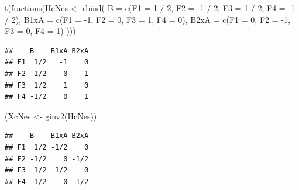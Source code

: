 \documentclass[
  12pt,
]{krantz}
\newenvironment{Shaded}{\begin{snugshade}}{\end{snugshade}}
\newcommand{\AttributeTok}[1]{\textcolor[rgb]{0.77,0.63,0.00}{#1}}
\newcommand{\DecValTok}[1]{\textcolor[rgb]{0.00,0.00,0.81}{#1}}
\newcommand{\FunctionTok}[1]{\textcolor[rgb]{0.00,0.00,0.00}{#1}}
\newcommand{\NormalTok}[1]{#1}
\newcommand{\OtherTok}[1]{\textcolor[rgb]{0.56,0.35,0.01}{#1}}
\newcommand{\SpecialCharTok}[1]{\textcolor[rgb]{0.00,0.00,0.00}{#1}}
\theoremstyle{definition}
\theoremstyle{definition}
\theoremstyle{definition}
\theoremstyle{definition}
\theoremstyle{remark}
\begin{document}
\begin{Shaded}
\begin{Highlighting}[]
\FunctionTok{t}\NormalTok{(}\FunctionTok{fractions}\NormalTok{(HcNes }\OtherTok{\textless{}{-}} \FunctionTok{rbind}\NormalTok{(}
  \AttributeTok{B =} \FunctionTok{c}\NormalTok{(}\AttributeTok{F1 =} \DecValTok{1} \SpecialCharTok{/} \DecValTok{2}\NormalTok{, }\AttributeTok{F2 =} \SpecialCharTok{{-}}\DecValTok{1} \SpecialCharTok{/} \DecValTok{2}\NormalTok{, }\AttributeTok{F3 =} \DecValTok{1} \SpecialCharTok{/} \DecValTok{2}\NormalTok{, }\AttributeTok{F4 =} \SpecialCharTok{{-}}\DecValTok{1} \SpecialCharTok{/} \DecValTok{2}\NormalTok{),}
  \AttributeTok{B1xA =} \FunctionTok{c}\NormalTok{(}\AttributeTok{F1 =} \SpecialCharTok{{-}}\DecValTok{1}\NormalTok{, }\AttributeTok{F2 =} \DecValTok{0}\NormalTok{, }\AttributeTok{F3 =} \DecValTok{1}\NormalTok{, }\AttributeTok{F4 =} \DecValTok{0}\NormalTok{),}
  \AttributeTok{B2xA =} \FunctionTok{c}\NormalTok{(}\AttributeTok{F1 =} \DecValTok{0}\NormalTok{, }\AttributeTok{F2 =} \SpecialCharTok{{-}}\DecValTok{1}\NormalTok{, }\AttributeTok{F3 =} \DecValTok{0}\NormalTok{, }\AttributeTok{F4 =} \DecValTok{1}\NormalTok{)}
\NormalTok{)))}
\end{Highlighting}
\end{Shaded}

\begin{verbatim}
##    B    B1xA B2xA
## F1  1/2   -1    0
## F2 -1/2    0   -1
## F3  1/2    1    0
## F4 -1/2    0    1
\end{verbatim}

\begin{Shaded}
\begin{Highlighting}[]
\NormalTok{(XcNes }\OtherTok{\textless{}{-}} \FunctionTok{ginv2}\NormalTok{(HcNes))}
\end{Highlighting}
\end{Shaded}

\begin{verbatim}
##    B    B1xA B2xA
## F1  1/2 -1/2    0
## F2 -1/2    0 -1/2
## F3  1/2  1/2    0
## F4 -1/2    0  1/2
\end{verbatim}

\begin{Shaded}
\end{Shaded}
\end{document}
